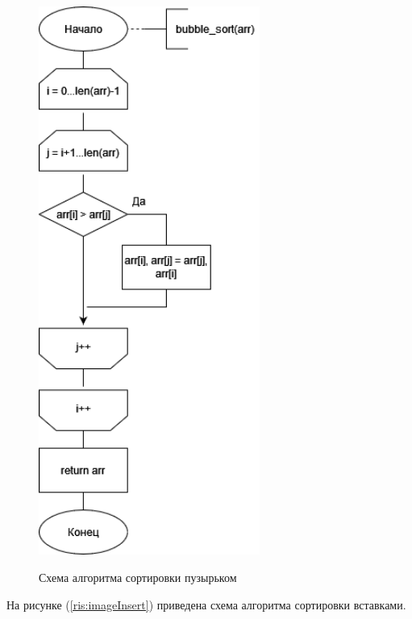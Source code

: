 \documentclass[12pt]{report}
\begin{document}
\begin{figure}
	\begin{center}
	{\includegraphics[height = 18cm]{bubble.jpg}}
	\caption{Схема алгоритма сортировки пузырьком}
	\label{ris:imageBubble}
	\end{center}
\end{figure}
\newpage
На рисунке (\ref{ris:imageInsert}) приведена схема алгоритма сортировки вставками.
\end{document}

